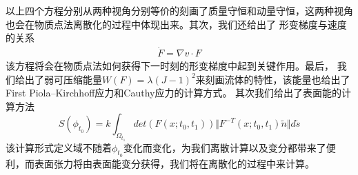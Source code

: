以上四个方程分别从两种视角分别等价的刻画了质量守恒和动量守恒，这两种视角也会在物质点法离散化的过程中体现出来。其次，我们还给出了
形变梯度与速度的关系
\begin{align*}
    \dot{F} = \nabla v \cdot F
\end{align*}
该方程将会在物质点法如何获得下一时刻的形变梯度中起到关键作用。最后，
我们给出了弱可压缩能量$W(F)=\lambda (J-1)^2$来刻画流体的特性，该能量也给出了First Piola–Kirchhoff应力和Cauthy应力的计算方式。
其次我们给出了表面能的计算方法
$$S(\phi_{t_0}) = k \int_{\Omega_{t_1}} det(F(x;t_0,t_1)) \Vert F^{-T}(x;t_0,t_1)\tilde{n}\Vert d\tilde{s}$$
该计算形式定义域不随着$\phi_{t_0}$变化而变化，为我们离散计算以及变分都带来了便利，而表面张力将由表面能变分获得，我们将在离散化的过程中来计算。







